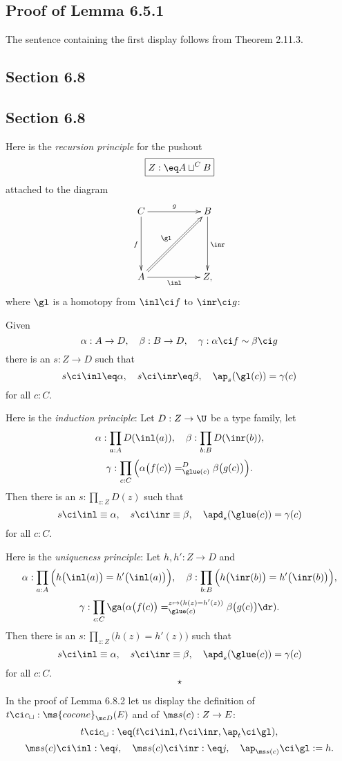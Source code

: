 \documentclass[12pt]{article}
\begin{document}

\subsection{Proof of Lemma 6.5.1}

The sentence containing the first display follows from Theorem 2.11.3.


\subsection{Section 6.8}

\subsection{Section 6.8}

Here is the \emph{recursion principle} for the pushout 
$$
\boxed{Z:\eq A\sqcup^CB}
$$ 
attached to the diagram 
$$
\xymatrix{
C\ar[rr]^g\ar[dd]_f&&B\ar[dd]^{\inr}\\ \\ 
A\ar[rr]_{\inl}\ar@{=>}[uurr]^{\gl}&&Z,
}
$$ 
where $\gl$ is a homotopy from $\inl\ci f$ to $\inr\ci g$: 

Given 
$$
\alpha:A\to D,\quad\beta:B\to D,\quad\gamma:\alpha\ci f\sim\beta\ci g
$$ 
there is an $s:Z\to D$ such that 
$$
s\ci\inl\eq\alpha,\quad s\ci\inr\eq\beta,\quad\ap_s(\gl(c))=\gamma(c)
$$ 
for all $c:C$.

Here is the \emph{induction principle}: Let $D:Z\to\U$ be a type family, let 
$$
\alpha:\prod_{a:A}D(\inl(a)),\quad\beta:\prod_{b:B}D(\inr(b)),
$$
$$
\gamma:\prod_{c:C}\Big(\alpha\big(f(c)\big)=^D_{\glue(c)}\beta\big(g(c)\big)\Big).
$$ 
Then there is an $s:\prod_{z:Z}D(z)$ such that 
$$
s\ci\inl\equiv\alpha,\quad s\ci\inr\equiv\beta,\quad\apd_s(\glue(c))=\gamma(c)
$$ 
for all $c:C$. 

Here is the \emph{uniqueness principle}: Let $h,h':Z\to D$ and 
$$
\alpha:\prod_{a:A}\Big(h\big(\inl(a)\big)=h'\big(\inl(a)\big)\Big),\quad\beta:\prod_{b:B}\Big(h\big(\inr(b)\big)=h'\big(\inr(b)\big)\Big),
$$
$$
\gamma:\prod_{c:C}\ga(\alpha\big(f(c)\big)=^{z\mapsto(h(z)=h'(z))}_{\glue(c)}\beta\big(g(c)\big)\dr).
$$ 
Then there is an $s:\prod_{z:Z}\big(h(z)=h'(z)\big)$ such that 
$$
s\ci\inl\equiv\alpha,\quad s\ci\inr\equiv\beta,\quad\apd_s(\glue(c))=\gamma(c)
$$ 
for all $c:C$.  
$$
\star
$$

In the proof of Lemma 6.8.2 let us display the definition of $t\ci c_{\sqcup}:\ms{cocone}_{\mc D}(E)$ and of $\ms s(c):Z\to E$: 
$$
t\ci c_{\sqcup}:\eq(t\ci\inl,t\ci\inr,\ap_t\ci\gl),
$$ 
$$
\ms s(c)\ci\inl:\eq i,\quad\ms s(c)\ci\inr :\eq j,\quad\ap_{\ms s(c)}\ci\gl:=h.
$$ 
\end{document}
